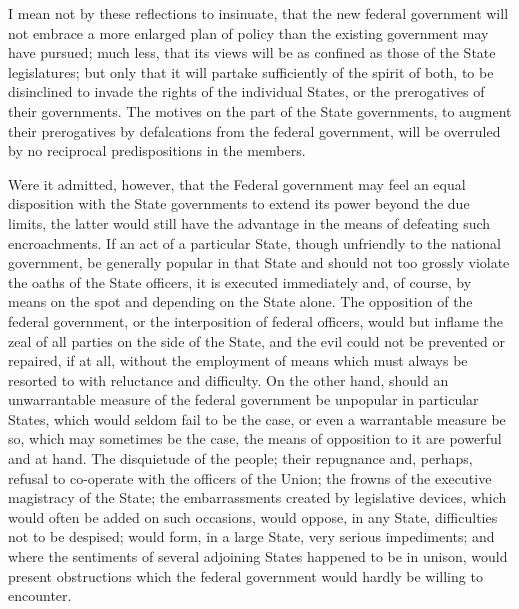 I mean not by these reflections to insinuate, that the new federal government will not embrace a more enlarged plan of policy than the existing government may have pursued; much less, that its views will be as confined as those of the State legislatures; but only that it will partake sufficiently of the spirit of both, to be disinclined to invade the rights of the individual States, or the prerogatives of their governments. 
The motives on the part of the State governments, to augment their prerogatives by defalcations from the federal government, will be overruled by no reciprocal predispositions in the members.

Were it admitted, however, that the Federal government may feel an equal disposition with the State governments to extend its power beyond the due limits, the latter would still have the advantage in the means of defeating such encroachments. 
If an act of a particular State, though unfriendly to the national government, be generally popular in that State and should not too grossly violate the oaths of the State officers, it is executed immediately and, of course, by means on the spot and depending on the State alone. 
The opposition of the federal government, or the interposition of federal officers, would but inflame the zeal of all parties on the side of the State, and the evil could not be prevented or repaired, if at all, without the employment of means which must always be resorted to with reluctance and difficulty. 
On the other hand, should an unwarrantable measure of the federal government be unpopular in particular States, which would seldom fail to be the case, or even a warrantable measure be so, which may sometimes be the case, the means of opposition to it are powerful and at hand. 
The disquietude of the people; their repugnance and, perhaps, refusal to co-operate with the officers of the Union; the frowns of the executive magistracy of the State; the embarrassments created by legislative devices, which would often be added on such occasions, would oppose, in any State, difficulties not to be despised; would form, in a large State, very serious impediments; and where the sentiments of several adjoining States happened to be in unison, would present obstructions which the federal government would hardly be willing to encounter.

